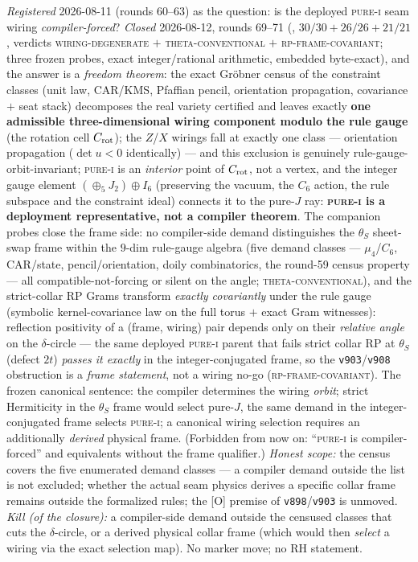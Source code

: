 \documentclass[11pt,a4paper]{article}
\begin{document}
{\sloppy
\emph{Registered} 2026-08-11 (rounds 60--63) as the question:
is the deployed \textsc{pure-i} seam wiring
\emph{compiler-forced}?  \emph{Closed} 2026-08-12, rounds
69--71 (, $30/30 + 26/26 +
21/21$, verdicts \textsc{wiring-degenerate} $+$
\textsc{theta-conventional} $+$ \textsc{rp-frame-covariant};
three frozen probes, exact integer/rational arithmetic,
embedded byte-exact), and the answer is a \emph{freedom
theorem}: the exact Gr\"obner census of the constraint classes
(unit law, CAR/KMS, Pfaffian pencil, orientation propagation,
covariance $+$ seat stack) decomposes the real variety
certified and leaves exactly \textbf{one admissible
three-dimensional wiring component modulo the rule gauge} (the
rotation cell $C_{\rm rot}$); the $Z$/$X$ wirings fall at
exactly one class --- orientation propagation ($\det u < 0$
identically) --- and this exclusion is genuinely
rule-gauge-orbit-invariant; \textsc{pure-i} is an
\emph{interior} point of $C_{\rm rot}$, not a vertex, and the
integer gauge element $(\oplus_5 J_2) \oplus I_6$ (preserving
the vacuum, the $C_6$ action, the rule subspace and the
constraint ideal) connects it to the pure-$J$ ray:
\textbf{\textsc{pure-i} is a deployment representative, not a
compiler theorem}.  The companion probes close the frame side:
no compiler-side demand distinguishes the $\theta_S$ sheet-swap
frame within the $9$-dim rule-gauge algebra (five demand
classes --- $\mu_4$/$C_6$, CAR/state, pencil/orientation, doily
combinatorics, the round-59 census property --- all
compatible-not-forcing or silent on the angle;
\textsc{theta-conventional}), and the strict-collar RP Grams
transform \emph{exactly covariantly} under the rule gauge
(symbolic kernel-covariance law on the full torus $+$ exact
Gram witnesses): reflection positivity of a (frame, wiring)
pair depends only on their \emph{relative angle} on the
$\delta$-circle --- the same deployed \textsc{pure-i} parent
that fails strict collar RP at $\theta_S$ (defect $2t$)
\emph{passes it exactly} in the integer-conjugated frame, so
the \texttt{v903}/\texttt{v908} obstruction is a
\emph{frame statement}, not a wiring no-go
(\textsc{rp-frame-covariant}).  The frozen canonical sentence:
the compiler determines the wiring \emph{orbit}; strict
Hermiticity in the $\theta_S$ frame would select pure-$J$, the
same demand in the integer-conjugated frame selects
\textsc{pure-i}; a canonical wiring selection requires an
additionally \emph{derived} physical frame.  (Forbidden from
now on: ``\textsc{pure-i} is compiler-forced'' and equivalents
without the frame qualifier.)  \emph{Honest scope:} the census
covers the five enumerated demand classes --- a compiler demand
outside the list is not excluded; whether the actual seam
physics derives a specific collar frame remains outside the
formalized rules; the [O] premise of
\texttt{v898}/\texttt{v903} is unmoved.  \emph{Kill (of the
closure):} a compiler-side demand outside the censused classes
that cuts the $\delta$-circle, or a derived physical collar
frame (which would then \emph{select} a wiring via the exact
selection map).  No marker move; no RH statement.\par}
\end{document}
